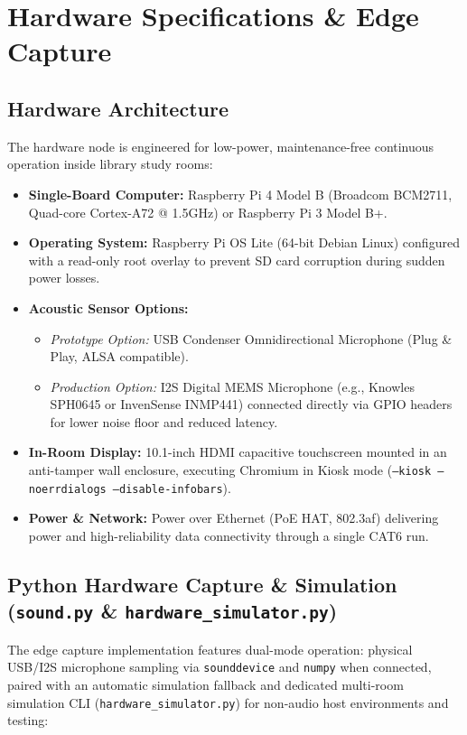 \documentclass[11pt,a4paper]{article}
\begin{document}
\section{Hardware Specifications \& Edge Capture}

\subsection{Hardware Architecture}
The hardware node is engineered for low-power, maintenance-free continuous operation inside library study rooms:
\begin{itemize}[leftmargin=*]
    \item \textbf{Single-Board Computer:} Raspberry Pi 4 Model B (Broadcom BCM2711, Quad-core Cortex-A72 @ 1.5GHz) or Raspberry Pi 3 Model B+.
    \item \textbf{Operating System:} Raspberry Pi OS Lite (64-bit Debian Linux) configured with a read-only root overlay to prevent SD card corruption during sudden power losses.
    \item \textbf{Acoustic Sensor Options:}
    \begin{itemize}
        \item \textit{Prototype Option:} USB Condenser Omnidirectional Microphone (Plug \& Play, ALSA compatible).
        \item \textit{Production Option:} I2S Digital MEMS Microphone (e.g., Knowles SPH0645 or InvenSense INMP441) connected directly via GPIO headers for lower noise floor and reduced latency.
    \end{itemize}
    \item \textbf{In-Room Display:} 10.1-inch HDMI capacitive touchscreen mounted in an anti-tamper wall enclosure, executing Chromium in Kiosk mode (\texttt{--kiosk --noerrdialogs --disable-infobars}).
    \item \textbf{Power \& Network:} Power over Ethernet (PoE HAT, 802.3af) delivering power and high-reliability data connectivity through a single CAT6 run.
\end{itemize}

\subsection{Python Hardware Capture \& Simulation (\texttt{sound.py} \& \texttt{hardware\_simulator.py})}
The edge capture implementation features dual-mode operation: physical USB/I2S microphone sampling via \texttt{sounddevice} and \texttt{numpy} when connected, paired with an automatic simulation fallback and dedicated multi-room simulation CLI (\texttt{hardware\_simulator.py}) for non-audio host environments and testing:
\end{document}
